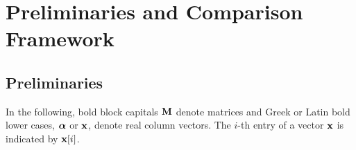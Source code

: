 \section{Preliminaries and Comparison Framework}\label{sec:preliminaries}





\subsection{Preliminaries}
In the following, bold block capitals $\textbf{M}$ denote matrices and Greek or Latin bold lower cases, $\boldsymbol\alpha$ or   $\textbf{x}$, denote real column vectors. The $i$-th entry of a vector $\textbf{x}$ is indicated by $\textbf{x}[i]$.\\

